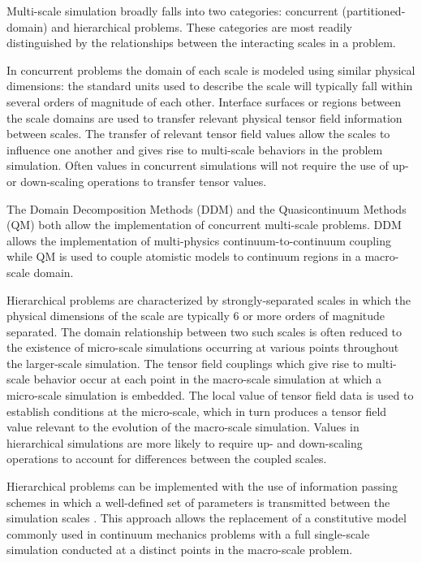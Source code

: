 \documentclass[review]{siamart1116}
\begin{document}
Multi-scale simulation broadly falls into two categories: concurrent (partitioned-domain) and hierarchical problems. These categories are most readily distinguished by the relationships between the interacting scales in a problem.

In concurrent problems the domain of each scale is modeled using similar physical dimensions: the standard units used to describe the scale will typically fall within several orders of magnitude of each other. Interface surfaces or regions between the scale domains are used to transfer relevant physical tensor field information between scales. The transfer of relevant tensor field values allow the scales to influence one another and gives rise to multi-scale behaviors in the problem simulation. Often values in concurrent simulations will not require the use of up- or down-scaling operations to transfer tensor values. 

The Domain Decomposition Methods (DDM) \cite{toselli2005domain} and the Quasicontinuum Methods (QM) \cite{miller2002quasicontinuum} both allow the implementation of concurrent multi-scale problems. DDM allows the implementation of multi-physics continuum-to-continuum coupling while QM is used to couple atomistic models to continuum regions in a macro-scale domain.


Hierarchical problems are characterized by strongly-separated scales in which the physical dimensions of the scale are typically 6 or more orders of magnitude separated. The domain relationship between two such scales is often reduced to the existence of micro-scale simulations occurring at various points throughout the larger-scale simulation. The tensor field couplings which give rise to multi-scale behavior occur at each point in the macro-scale simulation at which a micro-scale simulation is embedded. The local value of tensor field data is used to establish conditions at the micro-scale, which in turn produces a tensor field value relevant to the evolution of the macro-scale simulation. Values in hierarchical simulations are more likely to require up- and down-scaling operations to account for  differences between the coupled scales.

Hierarchical problems can be implemented with the use of information passing schemes in which a well-defined set of parameters is transmitted between the simulation scales \cite{weinan2011principles,buehler2006concurrent,fish2010multiscale}. This approach allows the replacement of a constitutive model commonly used in continuum mechanics problems with a full single-scale simulation conducted at a distinct points in the macro-scale problem.
\end{document}
